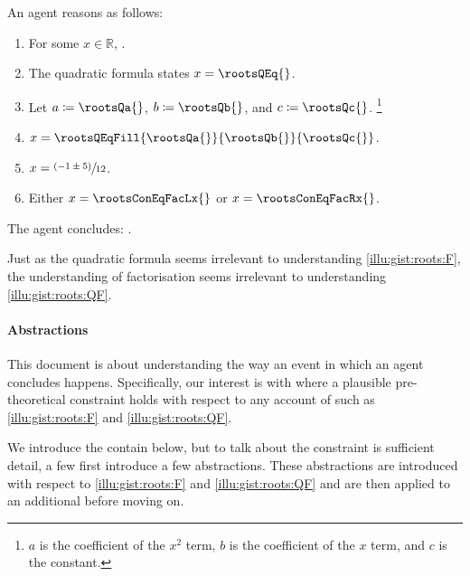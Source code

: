 \begin{note}
  \begin{scenario}%
    \label{illu:gist:roots:QF}%
    An agent reasons as follows:
    \begin{enumerate}[label=\arabic*., ref=\arabic*]
    \item
      \label{illu:gist:roots:QF:eq}
      For some \(x \in \mathbb{R}\), \rootsConEq{}.
    \item
      \label{illu:gist:roots:QF:qf}
      The quadratic formula states \(x = \rootsQEq{}\).
    \item
      \label{illu:gist:roots:QF:subs}
      Let \(a \coloneq \rootsQa{}\), \(b \coloneq \rootsQb{}\), and \(c \coloneq \rootsQc{}\).%
      \footnote{
        \(a\) is the coefficient of the \(x^{2}\) term, \(b\) is the coefficient of the \(x\) term, and \(c\) is the constant.
      }
    \item
      \label{illu:gist:roots:QF:qf-subs}
      \(x = \rootsQEqFill{\rootsQa{}}{\rootsQb{}}{\rootsQc{}}\).
    \item
      \label{illu:gist:roots:QF:qf:1}
      \(x = \sfrac{(- 1 \pm 5)}{12}\).
    \item
      \label{illu:gist:roots:QF:qf:done}
      Either \(x = \rootsConEqFacLx{}\) or \(x = \rootsConEqFacRx{}\).
    \end{enumerate}
    The agent concludes:
    \rootsCon{}.
  \end{scenario}

  \noindent%
  Just as the quadratic formula seems irrelevant to understanding \autoref{illu:gist:roots:F}, the \agents{} understanding of factorisation seems irrelevant to understanding \autoref{illu:gist:roots:QF}.
\end{note}



\paragraph*{Abstractions}


\begin{note}
  This document is about understanding the way an event in which an agent concludes happens.
  Specifically, our interest is with where a plausible pre-theoretical constraint holds with respect to any account of  such as \autoref{illu:gist:roots:F} and \autoref{illu:gist:roots:QF}.

  We introduce the contain below, but to talk about the constraint is sufficient detail, a few first introduce a few abstractions.
  These abstractions are introduced with respect to  \ref{illu:gist:roots:F} and \ref{illu:gist:roots:QF} and are then applied to an additional \scen{} before moving on.
\end{note}


